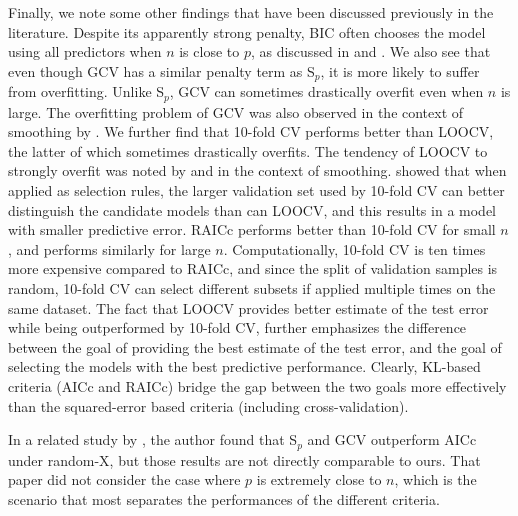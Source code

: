 Finally, we note some other findings that have been discussed previously in the literature. Despite its apparently strong penalty, BIC often chooses the model using all predictors when $n$ is close to $p$, as discussed in \citet{hurvich1989regression} and \citet{baraud2009gaussian}. We also see that even though GCV has a similar penalty term as S$_p$, it is more likely to suffer from overfitting. Unlike S$_p$, GCV can sometimes drastically overfit even when $n$ is large. The overfitting problem of GCV was also observed in the context of smoothing by \citet{hurvich1998smoothing}. We further find that 10-fold CV performs better than LOOCV, the latter of which sometimes drastically overfits. The tendency of LOOCV to strongly overfit was noted by \citet{scott1987biased} and \citet{hall1991local} in the context of smoothing. \citet{zhang2015cross} showed that when applied as selection rules, the larger validation set used by 10-fold CV can better distinguish the candidate models than can LOOCV, and this results in a model with smaller predictive error. RAICc performs better than 10-fold CV for small $n$, and performs similarly for large $n$. Computationally, 10-fold CV is ten times more expensive compared to RAICc, and since the split of validation samples is random, 10-fold CV can select different subsets if applied multiple times on the same dataset. The fact that LOOCV provides better estimate of the test error while being outperformed by 10-fold CV, further emphasizes the difference between the goal of providing the best estimate of the test error, and the goal of selecting the models with the best predictive performance. Clearly, KL-based criteria (AICc and RAICc) bridge the gap between the two goals more effectively than the squared-error based criteria (including cross-validation).

In a related study by \citet{leeb2008evaluation}, the author found that S$_p$ and GCV outperform AICc under random-X, but those results are not directly comparable to ours. That paper did not consider the case where $p$ is extremely close to $n$, which is the scenario that most separates the performances of the different criteria. 

